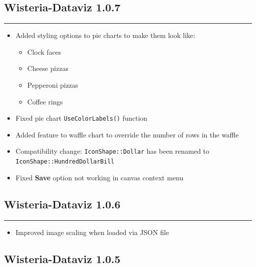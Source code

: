 \documentclass[
]{scrartcl}
\providecommand{\tightlist}{%
  \setlength{\itemsep}{0pt}\setlength{\parskip}{0pt}}
\begin{document}
\subsection*{Wisteria-Dataviz 1.0.7}\label{section-5}

\begin{center}\rule{0.5\linewidth}{0.5pt}\end{center}

\begin{itemize}
\tightlist
\item
  Added styling options to pie charts to make them look like:

  \begin{itemize}
  \tightlist
  \item
    Clock faces
  \item
    Cheese pizzas
  \item
    Pepperoni pizzas
  \item
    Coffee rings
  \end{itemize}
\item
  Fixed pie chart \texttt{UseColorLabels()} function
\item
  Added feature to waffle chart to override the number of rows in the
  waffle
\item
  Compatibility change: \texttt{IconShape::Dollar} has been renamed to
  \texttt{IconShape::HundredDollarBill}
\item
  Fixed \textbf{Save} option not working in canvas context menu
\end{itemize}

\subsection*{Wisteria-Dataviz 1.0.6}\label{section-6}

\begin{center}\rule{0.5\linewidth}{0.5pt}\end{center}

\begin{itemize}
\tightlist
\item
  Improved image scaling when loaded via JSON file
\end{itemize}

\subsection*{Wisteria-Dataviz 1.0.5}\label{section-7}
\end{document}

